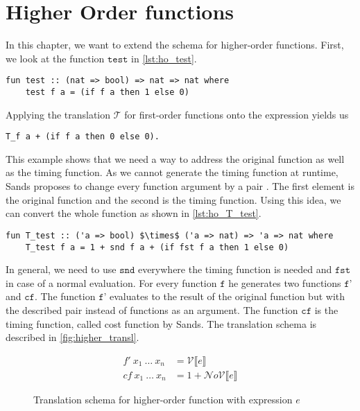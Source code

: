 
\section{Higher Order functions} \label{chapter:higher_order}

In this chapter, we want to extend the schema for higher-order functions.
First, we look at the function $\texttt{test}$ in \autoref{lst:ho_test}.
\begin{lstlisting}[language=isabelle,mathescape=true,label=lst:ho_test,caption=Example function]
  fun test :: (nat => bool) => nat => nat where
    test f a = (if f a then 1 else 0)
\end{lstlisting}
Applying the translation $\mathcal{T}$ for first-order functions onto the expression yields us
\begin{lstlisting}[language=isabelle,mathescape=true]
  T_f a + (if f a then 0 else 0).
\end{lstlisting}

This example shows that we need a way to address the original function as well as the timing function.
As we cannot generate the timing function at runtime, Sands proposes to change every function argument by a pair \parencite{sands}.
The first element is the original function and the second is the timing function.
Using this idea, we can convert the whole function as shown in \autoref{lst:ho_T_test}.
\begin{lstlisting}[language=isabelle,mathescape=true,label=lst:ho_T_test,caption=Timing function of example function]
  fun T_test :: ('a => bool) $\times$ ('a => nat) => 'a => nat where
    T_test f a = 1 + snd f a + (if fst f a then 1 else 0)
\end{lstlisting}
In general, we need to use $\texttt{snd}$ everywhere the timing function is needed and $\texttt{fst}$ in case of a normal evaluation.
For every function $\texttt{f}$ he generates two functions $\texttt{f'}$ and $\texttt{cf}$.
The function $\texttt{f'}$ evaluates to the result of the original function but with the described pair instead of functions as an argument.
The function $\texttt{cf}$ is the timing function, called cost function by Sands.
The translation schema is described in \autoref{fig:higher_transl}.
\begin{figure}
  \begin{align*}
  f'\ x_{1}\ \dots\ x_{n} &= \mathcal{V}\llbracket e \rrbracket \\
  cf\ x_{1}\ \dots\ x_{n} &= 1 + \mathcal{N}o\mathcal{V}\llbracket e \rrbracket
  \end{align*}
  \caption{Translation schema for higher-order function with expression $e$}
  \label{fig:higher_transl}
\end{figure}


